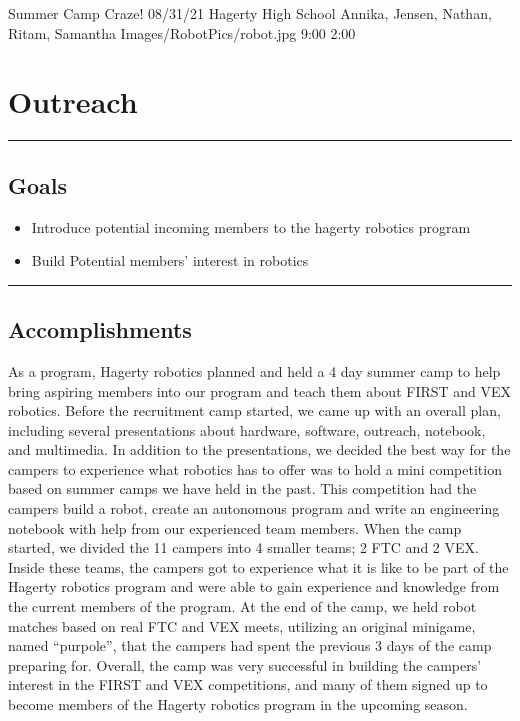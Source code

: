 \insertmeeting 
	{Summer Camp Craze!} 
	{08/31/21}
	{Hagerty High School}
	{Annika, Jensen, Nathan, Ritam, Samantha}
	{Images/RobotPics/robot.jpg}
	{9:00}
  {2:00}
	
\section*{Outreach}
\noindent\hfil\rule{\textwidth}{.4pt}\hfil
\subsection*{Goals}
\begin{itemize}
    \item Introduce potential incoming members to the hagerty robotics program
    \item Build Potential members' interest in robotics

\end{itemize} 

\noindent\hfil\rule{\textwidth}{.4pt}\hfil

\subsection*{Accomplishments}
As a program, Hagerty robotics planned and held a 4 day summer camp to help bring aspiring members into our program and teach them about FIRST and VEX robotics. Before the recruitment camp started, we came up with an overall plan, including several presentations about hardware, software, outreach, notebook, and multimedia. In addition to the presentations, we decided the best way for the campers to experience what robotics has to offer was to hold a mini competition based on summer camps we have held in the past. This competition had the campers build a robot, create an autonomous program and write an engineering notebook with help from our experienced team members. When the camp started, we divided the 11 campers into 4 smaller teams; 2 FTC and 2 VEX. Inside these teams, the campers got to experience what it is like to be part of the Hagerty robotics program and were able to gain experience and knowledge from the current members of the program. At the end of the camp, we held robot matches based on real FTC and VEX meets, utilizing an original minigame, named “purpole”, that the campers had spent the previous 3 days of the camp preparing for. Overall, the camp was very successful in building the campers’ interest in the FIRST and VEX competitions, and many of them signed up to become members of the Hagerty robotics program in the upcoming season.